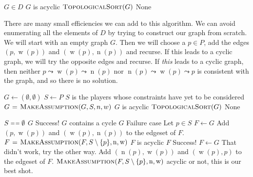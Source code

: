 \documentclass[12pt,x11names, rgb]{article}
\DeclareMathOperator{\w}{w}
\DeclareMathOperator{\n}{n}
\begin{document}
    \begin{codebox}
    \li \For $G\in D$
    \li     \Do
            \If $G$ is acyclic
    \li         \Do
                    \Return $\textnormal{\scshape TopologicalSort}(G)$
            \End
        \End
    \li \Return None
    \end{codebox}
        
    There are many small efficiencies we can add to this algorithm. We can avoid enumerating all the elements of $D$ by trying to construct our graph from scratch. We will start with an empty graph $G$. Then we will choose a $p \in P$, add the edges $(p,\w(p))$ and $(\w(p),\n(p))$ and recurse. If this leads to a cyclic graph, we will try the opposite edges and recurse. If \emph{this} leads to a cyclic graph, then neither $p \leadsto \w(p) \leadsto \n(p)$ nor $\n(p) \leadsto \w(p) \leadsto p$ is consistent with the graph, and so there is no solution.

    \begin{codebox}
    \li $G \gets (\emptyset, \emptyset)$
    \li $S \gets P$ \> \Comment $S$ is the players whose constraints have yet to be considered
    \li $G \mathrel{\hspace{1pt}=\hspace{1pt}} \textnormal{\scshape MakeAssumption}(G,S,n,w)$
    \li \If $G$ is acyclic
    \li     \Do
            \Return $\textnormal{\scshape TopologicalSort}(G)$
        \End
    \li \Return None
    \end{codebox}


    \begin{codebox}
    \Procname{$\proc{MakeAssumption}(G,S,\n,\w)$}
    \li \If $S \isequal \emptyset$
    \li     \Then
            \Return $G$ \Comment Success!
        \End
    \li \If $G$ contains a cycle
    \li     \Then
            \Return $G$ \Comment Failure case
        \End
    \li Let $p \in S$
    \li $F \gets G$
    \li Add $(p,\w(p))$ and $(\w(p),\n(p))$ to the edgeset of $F$.
    \li $F \gets \proc{MakeAssumption}(F,S\setminus \{p\}, \n, \w)$
    \li \If $F$ is acyclic
    \li     \Do
            \Return $F$ \Comment Success!
        \End
    \li $F \gets G$ \Comment That didn't work, try the other way.
    \li Add $(\n(p),\w(p))$ and $(\w(p),p)$ to the edgeset of $F$.
    \li \Return $\proc{MakeAssumption}(F,S\setminus \{p\}, \n, \w)$ \Comment acyclic or not, this is our best shot.
    \end{codebox}
\end{document}

